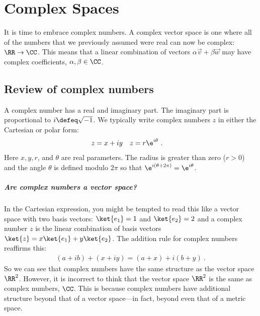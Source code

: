 
\chapter{Complex Spaces}


It is time to embrace complex numbers. A complex vector space is one where all of the numbers that we previously assumed were real can now be complex: $\RR \to \CC$. This means that a linear combination of vectors $\alpha\vec{v}+ \beta\vec{w}$ may have complex coefficients, $\alpha,\beta\in\CC$. 

\section{Review of complex numbers}

A complex number has a real and imaginary part. The imaginary part is proportional to  $i \defeq \sqrt{-1}$. We typically write complex numbers $z$ in either the Cartesian or polar form:
\begin{align}
    z &= x+iy 
    &
    z &= r \e^{i\theta}
    \ .
\end{align}
Here $x,y,r$, and $\theta$ are real parameters. The radius is greater than zero ($r>0$) and the angle $\theta$ is defined modulo $2\pi$ so that $\e^{i(\theta+2\pi)} = \e^{i\theta}$.

\paragraph{Are complex numbers a vector space?}
In the Cartesian expression, you might be tempted to read this like a vector space with two basis vectors: $\ket{e_1}=1$ and $\ket{e_2} = 2$ and a complex number $z$ is the linear combination of basis vectors $\ket{z} = x \ket{e_1} + y \ket{e_2}$. The addition rule for complex numbers reaffirms this:
\begin{align}
    (a+ib)+ (x+iy) = (a+x) + i (b+y) \ .
\end{align}
So we can see that complex numbers have the same structure as the vector space $\RR^2$. However, it is incorrect to think that the vector space $\RR^2$ is the same as complex numbers, $\CC$. This is because complex numbers have additional structure beyond that of a vector space---in fact, beyond even that of a metric space. 

